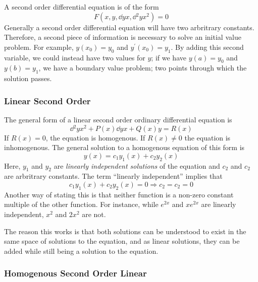 \documentclass[12pt]{report}
\begin{document}
\begin{flushleft}
A second order differential equation is of the form
\[F\left(x, y, \dd{y}{x}, \dd{^2y}{x^2}\right) = 0\]
Generally a second order differential equation will have two arbritrary
constants. Therefore, a second piece of information is necessary to solve an
initial value problem. For example, \(y(x_0) = y_0\) and
\(y^\prime(x_0) = y_1\). By adding this second variable, we could instead have
two values for \(y\); if we have \(y(a) = y_0\) and \(y(b) = y_1\), we have a
boundary value problem; two points through which the solution passes.

\subsubsection*{Linear Second Order}

The general form of a linear second order ordinary differential equation is
\[\dd{^2y}{x^2} + P(x)\dd{y}{x} + Q(x)y = R(x)\]
If \(R(x) = 0\), the equation is homogenous. If \(R(x) \neq 0\) the equation is
inhomogenous. The general solution to a homogenous equation of this form is
\[y(x) = c_1y_1(x) + c_2y_2(x)\]
Here, \(y_1\) and \(y_2\) are \textit{linearly independent solutions} of the
equation and \(c_2\) and \(c_2\) are arbritrary constants. The term ``linearly
independent'' implies that
\[c_1y_1(x) + c_2y_2(x) = 0 \Rightarrow c_2 = c_2 = 0\]
Another way of stating this is that neither function is a non-zero constant
multiple of the other function. For instance, while \(e^{2x}\) and \(xe^{2x}\)
are linearly independent, \(x^2\) and \(2x^2\) are not. \par
The reason this works is that both solutions can be understood to exist in the
same space of solutions to the equation, and as linear solutions, they can be
added while still being a solution to the equation.

\subsubsection*{Homogenous Second Order Linear}


\end{flushleft}
\end{document}
